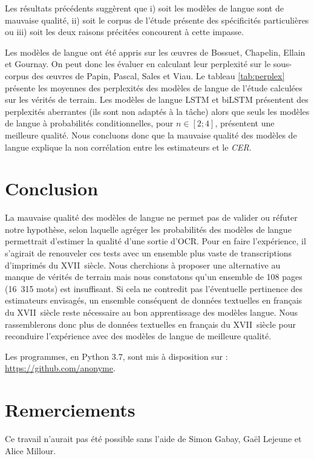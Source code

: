 \documentclass[10pt,twoside]{article}
\begin{document}
    Les résultats précédents suggèrent que i) soit les modèles de langue sont de mauvaise qualité, ii) soit le corpus de l'étude présente des spécificités particulières 
    ou iii) soit les deux raisons précitées concourent à cette impasse.

    Les modèles de langue ont été appris sur les \oe{}uvres de Bossuet, Chapelin, Ellain et Gournay. On peut donc les
    évaluer en calculant leur perplexité sur le sous-corpus des \oe{}uvres de Papin, Pascal, Sales et Viau. 
    Le tableau \ref{tab:perplex} présente les moyennes des perplexités des modèles de langue
    de l'étude calculées sur les vérités de terrain. Les modèles de langue LSTM et biLSTM 
    présentent des perplexités aberrantes (ils sont non adaptés à la tâche) alors que seuls les modèles de langue à probabilités conditionnelles, pour $n \in \left[2;4\right]$,
    présentent une meilleure qualité. Nous concluons donc que la mauvaise qualité des modèles de langue
    explique la non corrélation entre les estimateurs et le \textit{CER}.



    


\section{Conclusion}
La mauvaise qualité des modèles de langue ne permet pas de valider ou réfuter notre hypothèse, selon laquelle agréger les 
probabilités des modèles de langue permettrait d'estimer la qualité d'une sortie d'OCR. Pour en faire l'expérience, il s'agirait 
de renouveler ces tests avec un ensemble plus vaste de transcriptions d'imprimés du XVII\ieme~siècle. Nous cherchions à proposer une 
alternative au manque de vérités de terrain mais nous constatons qu'un ensemble de 108 pages (16~315 mots) est insuffisant. 
Si cela ne contredit pas l'éventuelle pertinence des estimateurs envisagés, un ensemble conséquent de données textuelles en français du 
XVII\ieme~siècle reste nécessaire au bon apprentissage des modèles langue. Nous rassemblerons donc plus de données textuelles en 
français du XVII\ieme~siècle pour reconduire l'expérience avec des modèles de langue de meilleure qualité. 


Les programmes, en Python 3.7, sont mis à disposition sur : \url{https://github.com/anonyme}.

\section*{Remerciements}
Ce travail n'aurait pas été possible sans l'aide de Simon Gabay, Gaël Lejeune et Alice Millour.  



\nocite{Wick2018a, Springmann2016b, BergKirkpatrick2014a,Breuel2013a,Vamvakas2008a}



\end{document}
